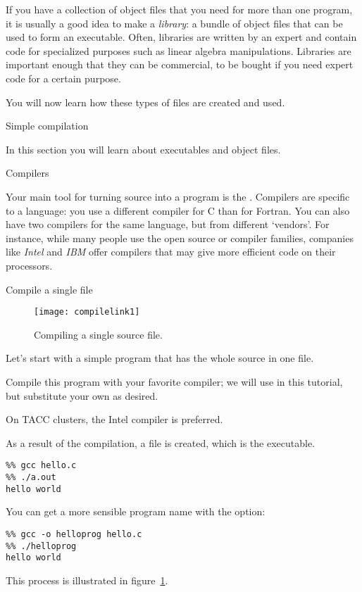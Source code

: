 If you have a collection of object files that you need for more than
one program, it is usually a good idea to make a 
\emph{library}: a bundle of object files that can be used to
  form an executable. Often, libraries are written by an expert and
  contain code for specialized purposes such as linear algebra
  manipulations. Libraries are important enough that they can be
  commercial, to be bought if you need expert code for a certain purpose.

You will now learn how these types of files are created and used.

 {Simple compilation}

\begin{purpose}
  In this section you will learn about executables and object files.
\end{purpose}

 {Compilers}

Your main tool for turning source into a program is the
. Compilers are specific to a language: you
use a different compiler for C than for Fortran.
You can also have two compilers for the same language, but from
different `vendors'. For instance, while many people use the open
source  or  compiler families,
companies like \emph{Intel} and
\emph{IBM} offer compilers that may give more
efficient code on their processors.

 {Compile a single file}

\begin{figure}[ht]
  \texttt{[image: compilelink1]}
  \caption{Compiling a single source file.}
  \label{fig:compilelink1}
\end{figure}

Let's start with a simple program that has the whole source in one
file.


Compile this program with your favorite compiler; we will use 
in this tutorial, but substitute your own as desired.
\begin{taccnote}
  On TACC clusters, the Intel compiler  is preferred.
\end{taccnote}
As a result of
the compilation, a file  is created, which is the executable.
\begin{verbatim}
%% gcc hello.c
%% ./a.out
hello world
\end{verbatim}
You can get a more sensible program name with the  option:
\begin{verbatim}
%% gcc -o helloprog hello.c
%% ./helloprog
hello world
\end{verbatim}
This process is illustrated in figure~\ref{fig:compilelink1}.

